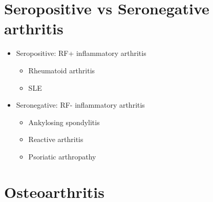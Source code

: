 \documentclass[
  12pt,
]{memoir}
\providecommand{\tightlist}{%
  \setlength{\itemsep}{0pt}\setlength{\parskip}{0pt}}
\begin{document}
\hypertarget{seropositive-vs-seronegative-arthritis}{%
\section{Seropositive vs Seronegative
arthritis}\label{seropositive-vs-seronegative-arthritis}}

\begin{itemize}
\tightlist
\item
  Seropositive: RF+ inflammatory arthritis

  \begin{itemize}
  \tightlist
  \item
    Rheumatoid arthritis
  \item
    SLE
  \end{itemize}
\item
  Seronegative: RF- inflammatory arthritis

  \begin{itemize}
  \tightlist
  \item
    Ankylosing spondylitis
  \item
    Reactive arthritis
  \item
    Psoriatic arthropathy
  \end{itemize}
\end{itemize}

\hypertarget{osteoarthritis}{%
\section{Osteoarthritis}\label{osteoarthritis}}
\end{document}

